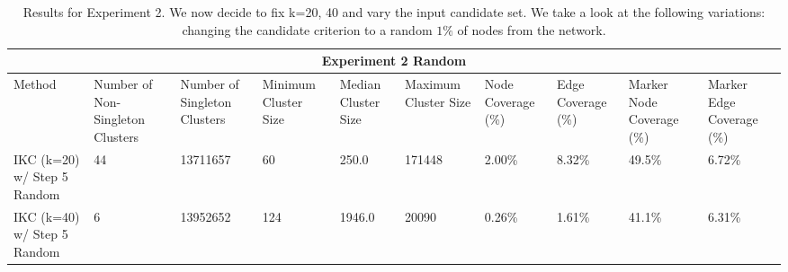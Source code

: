 \documentclass{article}
\begin{document}
\begin{table}[h!]
	\centering
	\begin{small}
		\begin{tabular}{ |p{0.95cm}||p{1.25cm}|p{1.25cm}||p{1.20cm}|p{1.20cm}|p{1.20cm}||p{1.25cm}|p{1.25cm}|| p{1.25cm}|p{1.25cm}| }
			\hline
			\multicolumn{10}{|c|}{Experiment 2 Random} \\
			\hline
			Method & Number of Non-Singleton Clusters & Number of Singleton Clusters & Minimum Cluster Size &  Median Cluster Size & Maximum Cluster Size & Node Coverage (\%)& Edge Coverage  (\%)& Marker Node Coverage  (\%)& Marker Edge Coverage  (\%)\\
			\hline
			IKC (k=20)  w/ Step 5 Random &  44    & \cellcolor{red!20}13711657 &   \cellcolor{blue!20}60 & \cellcolor{blue!20}250.0 & \cellcolor{blue!20}171448 & \cellcolor{blue!20}2.00\% & \cellcolor{blue!20}8.32\% & \cellcolor{blue!20}49.5\% & \cellcolor{blue!20}6.72\% \\ \hline
			
			IKC (k=40)  w/ Step 5 Random  &  6    & \cellcolor{red!20}13952652 &   \cellcolor{blue!20}124 & \cellcolor{blue!20}1946.0 & \cellcolor{blue!20}20090 & \cellcolor{blue!20}0.26\% & \cellcolor{blue!20}1.61\% & \cellcolor{blue!20}41.1\% & \cellcolor{blue!20}6.31\% \\ \hline
			\hline
		\end{tabular}
	\end{small}
	\caption{Results for Experiment 2. We now decide to fix k=20, 40 and vary the input candidate set. We take a look at the following variations:  changing the candidate criterion to a random $1\%$ of nodes from the network. }
	\label{table:expt2random}
\end{table}
\end{document}
